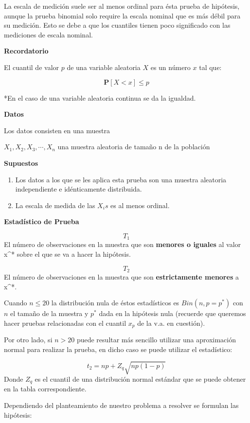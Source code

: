 \documentclass[a4paper,oneside,openany]{book}
\begin{document}
La escala de medición suele ser al menos ordinal para ésta prueba de
hipótesis, aunque la prueba binomial solo require la escala nominal que
es más débil para su medición. Esto se debe a que los cuantiles tienen
poco significado con las mediciones de escala nominal.

\textbf{Recordatorio}

El cuantil de valor \(p\) de una variable aleatoria \(X\) es un número
\(x\) tal que:

\[ \mathbf{P}[X < x]\leq p\]

*En el caso de una variable aleatoria continua se da la igualdad.

\textbf{Datos}

Los datos consisten en una muestra

\(X_{1},X_{2},X_{3},\cdots,X_{n}\) una muestra aleatoria de tamaño n de
la población

\textbf{Supuestos}

\begin{enumerate}
\def\labelenumi{\arabic{enumi})}
\item
  Los datos a los que se les aplica esta prueba son una muestra
  aleatoria independiente e idénticamente distribuida.
\item
  La escala de medida de las \(X_{i}s\) es al menos ordinal.
\end{enumerate}

\textbf{Estadístico de Prueba}

\[T_{1}\] El número de observaciones en la muestra que son
\textbf{menores o iguales} al valor x\^{}* sobre el que se va a hacer la
hipótesis.

\[T_{2}\] El número de observaciones en la muestra que son
\textbf{estrictamente menores} a x\^{}*.

Cuando \(n\leq 20\) la distribución nula de éstos estadísticos es
\(Bin(n,p=p^*)\) con \(n\) el tamaño de la muestra y \(p^*\) dada en la
hipótesis nula (recuerde que queremos hacer pruebas relacionadas con el
cuantil \(x_{p}\) de la v.a. en cuestión).

Por otro lado, si \(n>20\) puede resultar más sencillo utilizar una
aproximación normal para realizar la prueba, en dicho caso se puede
utilizar el estadístico:

\[t_{2}=np+Z_{q}\sqrt{np(1-p)}\] Donde \(Z_{q}\) es el cuantil de una
distribución normal estándar que se puede obtener en la tabla
correspondiente.

Dependiendo del planteamiento de nuestro problema a resolver se formulan
las hipótesis:
\end{document}
